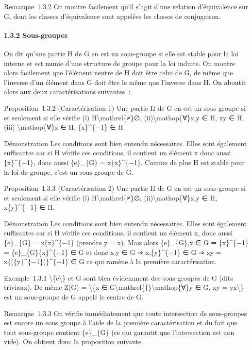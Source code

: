 \documentclass[]{article}
\begin{document}
Remarque~1.3.2 On montre facilement qu'il s'agit d'une relation
d'équivalence sur G, dont les classes d'équivalence sont appelées les
classes de conjugaison.

\paragraph{1.3.2 Sous-groupes}

On dit qu'une partie H de G en est un sous-groupe si elle est stable
pour la loi interne et est munie d'une structure de groupe pour la loi
induite. On montre alors facilement que l'élément neutre de H doit être
celui de G, de même que l'inverse d'un élément dans G doit être le même
que l'inverse dans H. On aboutit alors aux deux caractérisations
suivantes~:

Proposition~1.3.2 (Caractérisation 1) Une partie H de G en est un
sous-groupe si et seulement si elle vérifie (i)
H\textbackslash{}mathrel\{≠\}∅, (ii)\textbackslash{}mathop\{∀\}x,y ∈ H,
xy ∈ H, (iii) \textbackslash{}mathop\{∀\}x ∈ H, \{x\}\^{}\{−1\} ∈ H.

Démonstration Les conditions sont bien entendu nécessaires. Elles sont
également suffisantes car si H vérifie ces conditions, il contient un
élément x donc aussi \{x\}\^{}\{−1\}, donc aussi \{e\}\_\{G\} =
x\{x\}\^{}\{−1\}. Comme de plus H est stable pour la loi de groupe,
c'est un sous-groupe de G.

Proposition~1.3.3 (Caractérisation 2) Une partie H de G en est un
sous-groupe si et seulement si elle vérifie (i)
H\textbackslash{}mathrel\{≠\}∅, (ii)\textbackslash{}mathop\{∀\}x,y ∈ H,
x\{y\}\^{}\{−1\} ∈ H.

Démonstration Les conditions sont bien entendu nécessaires. Elles sont
également suffisantes car si H vérifie ces conditions, il contient un
élément x, donc aussi \{e\}\_\{G\} = x\{x\}\^{}\{−1\} (prendre y = x).
Mais alors \{e\}\_\{G\},x ∈ G ⇒ \{x\}\^{}\{−1\} =
\{e\}\_\{G\}\{x\}\^{}\{−1\} ∈ G et donc x,y ∈ G ⇒ x,\{y\}\^{}\{−1\} ∈ G
⇒ xy = x\{(\{y\}\^{}\{−1\})\}\^{}\{−1\} ∈ G ce qui ramène à la première
caractérisation.

Exemple~1.3.1 \textbackslash{}\{e\textbackslash{}\} et G sont bien
évidemment des sous-groupes de G (dits triviaux). De même Z(G) =
\textbackslash{}\{x ∈
G\textbackslash{}mathrel\{∣\}\textbackslash{}mathop\{∀\}y ∈ G, xy =
yx\textbackslash{}\} est un sous-groupe de G appelé le centre de G.

Remarque~1.3.3 On vérifie immédiatement que toute intersection de
sous-groupes est encore un sous groupe à l'aide de la première
caractérisation et du fait que tout sous-groupe contient \{e\}\_\{G\}
(ce qui garantit que l'intersection est non vide). On obtient donc la
proposition suivante
\end{document}
